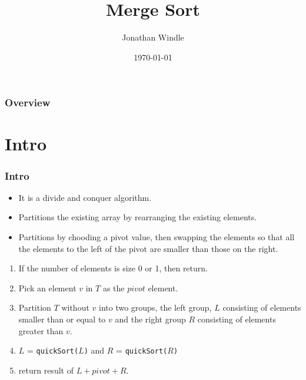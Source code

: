\documentclass{beamer}
\title[Merge Sort]{Merge Sort} %
\author{Jonathan Windle} %
\institute[UEA] %
{
University of East Anglia \\ %
\medskip
\textit{J.Windle@uea.ac.uk} %
}
\date{\today} %
\begin{document}
\begin{frame}
\titlepage %
\end{frame}

\begin{frame}[allowframebreaks]
\frametitle{Overview} %
\tableofcontents %
\end{frame} 

\section{Intro}
\begin{frame}
\frametitle{Intro}
\begin{itemize}
\item It is a divide and conquer algorithm.
\item Partitions the existing array by rearranging the existing elements.
\item Partitions by chooding a pivot value, then swapping the elements so that all the elements to the left of the pivot are smaller than those on the right.
\end{itemize}
\begin{enumerate}
\item If the number of elements is size 0 or 1, then return.
\item Pick an element $v$ in $T$ as the $pivot$ element.
\item Partition $T$ without $v$ into two groups, the left group, $L$ consisting of elements smaller than or equal to $v$ and the right group $R$ consisting of elements greater than $v$.
\item $L$ = \texttt{quickSort($L$)} and $R$ = \texttt{quickSort($R$)}
\item return result of $L+pivot+R$.
\end{enumerate}
\end{frame}
\end{document}
